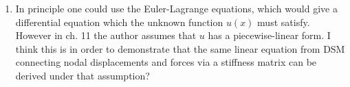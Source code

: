 \begin{enumerate}
  \begin{align*}
    \int \text{KE}\(y'(t)\) - \text{PE}\(y(t)\) \dt.
  \end{align*}
  In FEM we are trying to find a function $u(x)$ which minimizes the functional
  \begin{align*}
    \int \text{IE}\(u(x), u'(x)\) - \text{EE}\(x, u(x)\) \dx.
  \end{align*}
\item In principle one could use the Euler-Lagrange equations, which would give a differential equation which the unknown function $u(x)$ must
  satisfy. However in ch. 11 the author assumes that $u$ has a piecewise-linear form. I think this is in order to demonstrate that the same linear
  equation from DSM connecting nodal displacements and forces via a stiffness matrix can be derived under that assumption?
\end{enumerate}
